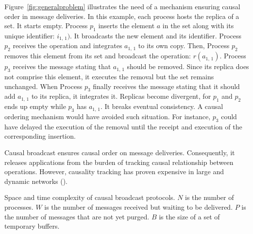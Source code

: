 Figure~\ref{fig:generalproblem} illustrates the need of a mechanism ensuring
causal order in message deliveries. %
In this example, each process hosts the replica of a set. It starts
empty. Process $p_1$ inserts the element $a$ in the set along with its unique
identifier: $i_{1,\,1})$. It broadcasts the new element and its
identifier. Process $p_2$ receives the operation and integrates $a_{1,\,1}$ to
its own copy. Then, Process $p_2$ removes this element from its set and
broadcast the operation: $r(a_{1,\,1})$. Process $p_3$ receives the message
stating that $a_{1,\,1}$ should be removed. Since its replica does not comprise
this element, it executes the removal but the set remains unchanged. When
Process $p_3$ finally receives the message stating that it should add
$a_{1,\,1}$ to its replica, it integrates it. Replicas become divergent, for
$p_1$ and $p_2$ ends up empty while $p_3$ has $a_{1,\,1}$. It breaks eventual
consistency. A causal ordering mechanism would have avoided such situation. For
instance, $p_3$ could have delayed the execution of the removal until the
receipt and execution of the corresponding insertion.

Causal broadcast ensures causal order on message deliveries. Consequently, it
releases applications from the burden of tracking causal relationship between
operations. However, causality tracking has proven expensive in large and
dynamic networks (\REF).

\begin{table}
  \caption{\label{table:comparison} Space and time complexity of causal broadcast protocols. $N$ is the number of processes. $W$ is the number of messages received but waiting to be delivered.
    $P$ is the number of messages that are not yet purged.
    $B$ is the size of a set of temporary buffers.}
  
\end{table}


